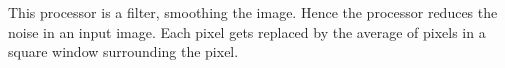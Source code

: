 This processor is a filter, smoothing the image. Hence the processor reduces the noise in an input image. Each pixel gets replaced by the average of pixels in a square window surrounding the pixel.